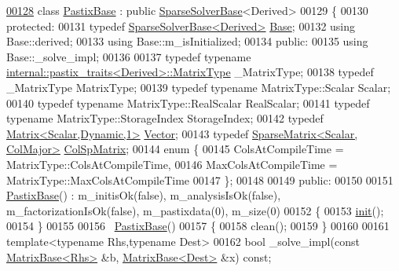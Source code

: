 \begin{DoxyCode}
\hyperlink{class_eigen_1_1_pastix_base}{00128} \textcolor{keyword}{class }\hyperlink{class_eigen_1_1_pastix_base}{PastixBase} : \textcolor{keyword}{public} \hyperlink{group___sparse_core___module_class_eigen_1_1_sparse_solver_base}{SparseSolverBase}<Derived>
00129 \{
00130   \textcolor{keyword}{protected}:
00131     \textcolor{keyword}{typedef} \hyperlink{group___sparse_core___module_class_eigen_1_1_sparse_solver_base}{SparseSolverBase<Derived>} \hyperlink{group___sparse_core___module_class_eigen_1_1_sparse_solver_base}{Base};
00132     \textcolor{keyword}{using} Base::derived;
00133     \textcolor{keyword}{using} Base::m\_isInitialized;
00134   \textcolor{keyword}{public}:
00135     \textcolor{keyword}{using} Base::\_solve\_impl;
00136     
00137     \textcolor{keyword}{typedef} \textcolor{keyword}{typename} \hyperlink{struct_eigen_1_1internal_1_1pastix__traits}{internal::pastix\_traits<Derived>::MatrixType}
       \_MatrixType;
00138     \textcolor{keyword}{typedef} \_MatrixType MatrixType;
00139     \textcolor{keyword}{typedef} \textcolor{keyword}{typename} MatrixType::Scalar Scalar;
00140     \textcolor{keyword}{typedef} \textcolor{keyword}{typename} MatrixType::RealScalar RealScalar;
00141     \textcolor{keyword}{typedef} \textcolor{keyword}{typename} MatrixType::StorageIndex StorageIndex;
00142     \textcolor{keyword}{typedef} \hyperlink{group___core___module}{Matrix<Scalar,Dynamic,1>} \hyperlink{group___core___module}{Vector};
00143     \textcolor{keyword}{typedef} \hyperlink{group___sparse_core___module}{SparseMatrix<Scalar, ColMajor>} 
      \hyperlink{group___sparse_core___module}{ColSpMatrix};
00144     \textcolor{keyword}{enum} \{
00145       ColsAtCompileTime = MatrixType::ColsAtCompileTime,
00146       MaxColsAtCompileTime = MatrixType::MaxColsAtCompileTime
00147     \};
00148     
00149   \textcolor{keyword}{public}:
00150     
00151     \hyperlink{class_eigen_1_1_pastix_base}{PastixBase}() : m\_initisOk(\textcolor{keyword}{false}), m\_analysisIsOk(\textcolor{keyword}{false}), m\_factorizationIsOk(\textcolor{keyword}{false}), 
      m\_pastixdata(0), m\_size(0)
00152     \{
00153       \hyperlink{structinit}{init}();
00154     \}
00155     
00156     ~\hyperlink{class_eigen_1_1_pastix_base}{PastixBase}() 
00157     \{
00158       clean();
00159     \}
00160     
00161     \textcolor{keyword}{template}<\textcolor{keyword}{typename} Rhs,\textcolor{keyword}{typename} Dest>
00162     \textcolor{keywordtype}{bool} \_solve\_impl(\textcolor{keyword}{const} \hyperlink{group___core___module_class_eigen_1_1_matrix_base}{MatrixBase<Rhs>} &b, \hyperlink{group___core___module_class_eigen_1_1_matrix_base}{MatrixBase<Dest>} &x) \textcolor{keyword}{const};

\end{DoxyCode}
